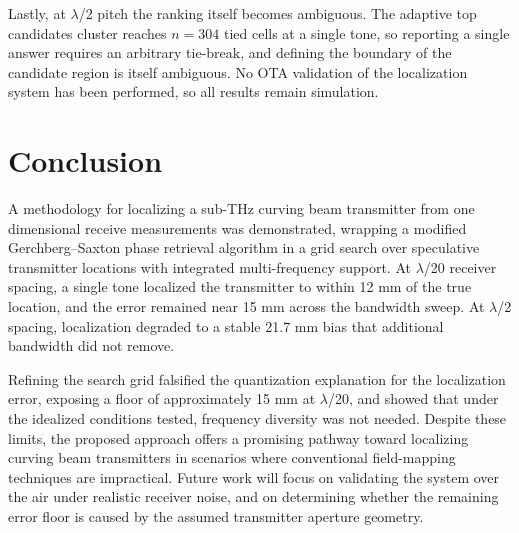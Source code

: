 \documentclass[11pt]{IEEEtran}
\begin{document}
Lastly, at \(\lambda\)/2 pitch the ranking itself becomes ambiguous.
The adaptive top candidates cluster reaches \(n = 304\) tied cells at a single tone, so reporting a single answer requires an arbitrary tie-break, and defining the boundary of the candidate region is itself ambiguous.
No OTA validation of the localization system has been performed, so all results remain simulation.

\section{Conclusion}

A methodology for localizing a sub-THz curving beam transmitter from one dimensional receive measurements was demonstrated, wrapping a modified Gerchberg--Saxton phase retrieval algorithm in a grid search over speculative transmitter locations with integrated multi-frequency support.
At \(\lambda\)/20 receiver spacing, a single tone localized the transmitter to within 12 mm of the true location, and the error remained near 15 mm across the bandwidth sweep.
At \(\lambda\)/2 spacing, localization degraded to a stable 21.7 mm bias that additional bandwidth did not remove.

Refining the search grid falsified the quantization explanation for the localization error, exposing a floor of approximately 15 mm at \(\lambda\)/20, and showed that under the idealized conditions tested, frequency diversity was not needed.
Despite these limits, the proposed approach offers a promising pathway toward localizing curving beam transmitters in scenarios where conventional field-mapping techniques are impractical.
Future work will focus on validating the system over the air under realistic receiver noise, and on determining whether the remaining error floor is caused by the assumed transmitter aperture geometry.












\end{document}
